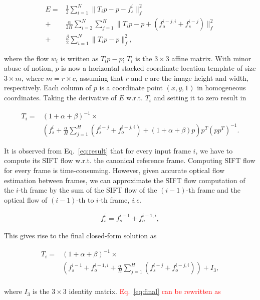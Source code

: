 \documentclass[10pt,journal]{IEEEtran}
\newcommand{\Songfan}[1]{\textcolor{red}{#1}}
\begin{document}
\begin{align}
	\label{data_affine}
E		=&\frac{1}{2}\sum_{i=1}^{N}\parallel{T_ip-p-f_s^i}\parallel_f^2
\\\label{smooth_affine}
				+&\frac{\alpha}{2H}\sum_{i=2}^{N}\sum_{j=1}^{H}\parallel{T_ip-p+(f_o^{i-j,i}+f_s^{i-j})}\parallel_f^2
\\\label{penalty_affine}
				+&\frac{\beta}{2}\sum_{i=1}^{N}\parallel{T_ip-p}\parallel_f^2,
\end{align} 

\noindent where the flow $w_i$ is written as $T_ip-p$; $T_i$ is the $3\times3$ affine matrix. With minor
 abuse of notion, $p$ is now a horizontal stacked coordinate location template of size $3\times m$, where $m=r\times c$, assuming that $r$ and $c$ are the image height and width, respectively. Each column of $p$ is a coordinate point $(x,y,1)$ in homogeneous coordinates. Taking the derivative of $E$ w.r.t. $T_i$ and setting it to zero result in 

\begin{align}
\label{eq:result}
T_i=&(1+\alpha+\beta)^{-1}\times \nonumber \\
		&(f_s^i+\frac{\alpha}{H}\sum_{j=1}^H(f_s^{i-j}+f_o^{i-j,i})+(1+\alpha+\beta)p)p^T(pp^T)^{-1}.
\end{align}

It is observed from Eq.~\eqref{eq:result} that for every input frame $i$, we have to compute its SIFT flow w.r.t. the canonical reference frame. Computing SIFT flow for every frame is time-consuming. However, given accurate optical flow estimation between frames, we can approximate the SIFT flow computation of the $i$-th frame by the sum of the SIFT flow of the $(i-1)$-th frame and the optical flow of $(i-1)$-th to $i$-th frame, \textit{i.e.}

\begin{align}
\label{eq:approx}
f_s^i=f_s^{i-1}+f_o^{i-1,i},
\end{align}

This gives rise to the final closed-form solution as

\begin{align}
\label{eq:final}
T_i=&(1+\alpha+\beta)^{-1}\times \nonumber \\
		&(f_s^{i-1}+f_o^{i-1,i}+\frac{\alpha}{H}\sum_{j=1}^H(f_s^{i-j}+f_o^{i-j,i})) + I_3, \nonumber \\
\end{align}

\noindent where $I_3$ is the $3\times 3$ identity matrix. \Songfan{Eq.~\eqref{eq:final} can be rewritten as}
\end{document}
